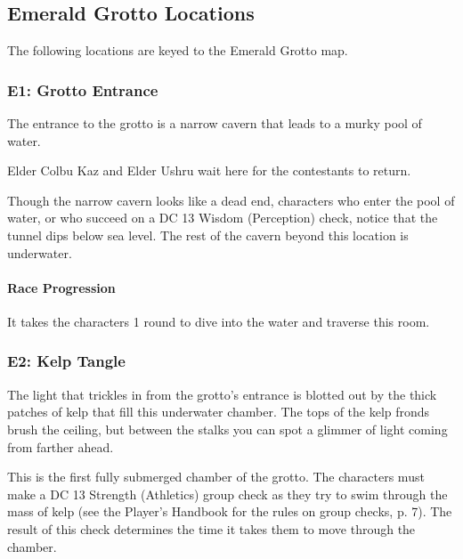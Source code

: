 \documentclass[a4paper, 11pt, bg=full, twocolumn, nooutline]{dndbook}
\begin{document}
\subsection{Emerald Grotto Locations}

The following locations are keyed to the Emerald Grotto map.



\subsubsection{E1: Grotto Entrance}

\begin{DndReadAloud}
The entrance to the grotto is a narrow cavern that leads to a murky pool of water.
\end{DndReadAloud}

Elder Colbu Kaz and Elder Ushru wait here for the contestants to return.

Though the narrow cavern looks like a dead end, characters who enter the pool of water, or who succeed on a DC 13 Wisdom (Perception) check, notice that the tunnel dips below sea level. The rest of the cavern beyond this location is underwater.

\paragraph{Race Progression}

It takes the characters 1 round to dive into the water and traverse this room.

\subsubsection{E2: Kelp Tangle}

\begin{DndReadAloud}
The light that trickles in from the grotto's entrance is blotted out by the thick patches of kelp that fill this underwater chamber. The tops of the kelp fronds brush the ceiling, but between the stalks you can spot a glimmer of light coming from farther ahead.
\end{DndReadAloud}

This is the first fully submerged chamber of the grotto. The characters must make a DC 13 Strength (Athletics) group check as they try to swim through the mass of kelp (see the Player's Handbook for the rules on group checks, p. 7). The result of this check determines the time it takes them to move through the chamber.
\end{document}
